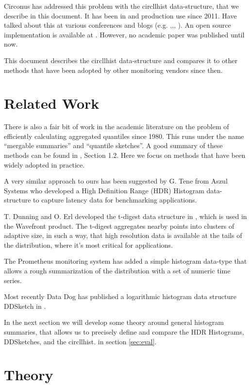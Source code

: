 \documentclass{article}
\theoremstyle{plain}
\theoremstyle{remark}
\begin{document}
Circonus has addressed this problem with the circllhist data-structure, that we describe in this document.
It has been in and production use since 2011.
Have talked about this at various conferences and blogs (e.g. \cite{TS0},\cite{TS1},\cite{TS2}, \cite{HH1}).
An open source implementation is available at \cite{libcircllhist}.
However, no academic paper was published until now.

This document describes the circllhist data-structure and compares it to other methods
that have been adopted by other monitoring vendors since then.

\section{Related Work}

There is also a fair bit of work in the academic literature on the problem of efficiently
calculating aggregated quantiles since 1980. This runs under the name ``mergable summaries'' and
``quantile sketches''. A good summary of these methods can be found in \cite{dd}, Section 1.2.
Here we focus on methods that have been widely adopted in practice.

A very similar approach to ours has been suggested by G. Tene from Aszul Systems who developed
a High Definition Range (HDR) Histogram data-structure \cite{hdr} to capture latency
data for benchmarking applications.

T. Dunning and O. Erl developed the t-digest data structure in \cite{tdigest}, which is used in the
Wavefront product. The t-digest aggregates nearby points into clusters of adaptive size, in such a
way, that high resolution data is available at the tails of the distribution, where it's most
critical for applications.

The Prometheus monitoring system \cite{prom} has added a simple histogram data-type that allows a
rough summarization of the distribution with a set of numeric time series.

Most recently Data Dog has published a logarithmic histogram data structure DDSketch in \cite{dd}.

In the next section we will develop some theory around general histogram summaries, that allows
us to precisely define and compare the HDR Histograms, DDSketches, and the circllhist.
in section \ref{sec:eval}.

\section{Theory}
\end{document}
